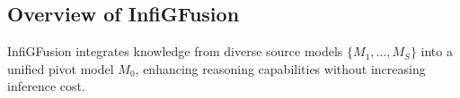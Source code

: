 \documentclass{article}
\begin{document}



\subsection{Overview of InfiGFusion}

InfiGFusion integrates knowledge from diverse source models $\{M_1, \dots, M_S\}$ into a unified pivot model $M_0$, enhancing reasoning capabilities without increasing inference cost.
\end{document}
